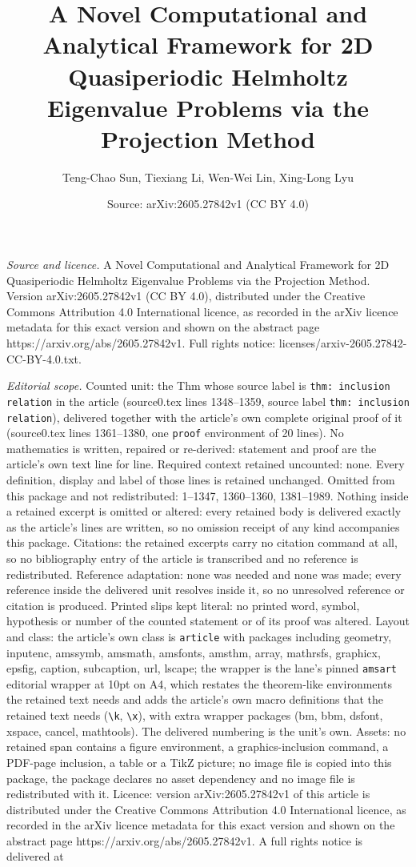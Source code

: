 \documentclass[10pt,a4paper]{amsart}
\title[A Novel Computational and Analytical Framework for 2D Quasip]{A Novel Computational and Analytical Framework for 2D Quasiperiodic Helmholtz Eigenvalue Problems via the Projection Method}
\author{Teng-Chao Sun, Tiexiang Li, Wen-Wei Lin, Xing-Long Lyu}
\date{Source: arXiv:2605.27842v1 (CC BY 4.0)}
\begin{document}
\maketitle

\noindent\emph{Source and licence.} A Novel Computational and Analytical Framework for 2D Quasiperiodic Helmholtz Eigenvalue Problems via the Projection Method. Version arXiv:2605.27842v1 (CC BY 4.0), distributed under the Creative Commons Attribution 4.0 International licence, as recorded in the arXiv licence metadata for this exact version and shown on the abstract page https://arxiv.org/abs/2605.27842v1. Full rights notice: licenses/arxiv-2605.27842-CC-BY-4.0.txt.\par\smallskip

\noindent\textit{Editorial scope.} Counted unit: the Thm whose source label is \texttt{thm: inclusion relation} in the article (source0.tex lines 1348--1359, source label \texttt{thm: inclusion relation}), delivered together with the article's own complete original proof of it (source0.tex lines 1361--1380, one \texttt{proof} environment of 20 lines). No mathematics is written, repaired or re-derived: statement and proof are the article's own text line for line. Required context retained uncounted: none. Every definition, display and label of those lines is retained unchanged. Omitted from this package and not redistributed: 1--1347, 1360--1360, 1381--1989. Nothing inside a retained excerpt is omitted or altered: every retained body is delivered exactly as the article's lines are written, so no omission receipt of any kind accompanies this package. Citations: the retained excerpts carry no citation command at all, so no bibliography entry of the article is transcribed and no reference is redistributed. Reference adaptation: none was needed and none was made; every reference inside the delivered unit resolves inside it, so no unresolved reference or citation is produced. Printed slips kept literal: no printed word, symbol, hypothesis or number of the counted statement or of its proof was altered. Layout and class: the article's own class is \texttt{article} with packages including geometry, inputenc, amssymb, amsmath, amsfonts, amsthm, array, mathrsfs, graphicx, epsfig, caption, subcaption, url, lscape; the wrapper is the lane's pinned \texttt{amsart} editorial wrapper at 10pt on A4, which restates the theorem-like environments the retained text needs and adds the article's own macro definitions that the retained text needs (\texttt{\textbackslash k}, \texttt{\textbackslash x}), with extra wrapper packages (bm, bbm, dsfont, xspace, cancel, mathtools). The delivered numbering is the unit's own. Assets: no retained span contains a figure environment, a graphics-inclusion command, a PDF-page inclusion, a table or a TikZ picture; no image file is copied into this package, the package declares no asset dependency and no image file is redistributed with it. Licence: version arXiv:2605.27842v1 of this article is distributed under the Creative Commons Attribution 4.0 International licence, as recorded in the arXiv licence metadata for this exact version and shown on the abstract page https://arxiv.org/abs/2605.27842v1. A full rights notice is delivered at 
\end{document}
